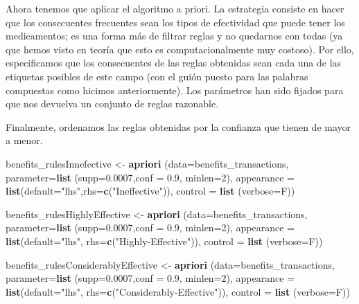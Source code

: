 \documentclass[spanish,]{article}
\newenvironment{Shaded}{\begin{snugshade}}{\end{snugshade}}
\newcommand{\KeywordTok}[1]{\textcolor[rgb]{0.13,0.29,0.53}{\textbf{#1}}}
\newcommand{\DataTypeTok}[1]{\textcolor[rgb]{0.13,0.29,0.53}{#1}}
\newcommand{\DecValTok}[1]{\textcolor[rgb]{0.00,0.00,0.81}{#1}}
\newcommand{\FloatTok}[1]{\textcolor[rgb]{0.00,0.00,0.81}{#1}}
\newcommand{\StringTok}[1]{\textcolor[rgb]{0.31,0.60,0.02}{#1}}
\newcommand{\NormalTok}[1]{#1}
\begin{document}
Ahora tenemos que aplicar el algoritmo a priori. La estrategia consiste
en hacer que los consecuentes frecuentes sean los tipos de efectividad
que puede tener los medicamentos; es una forma más de filtrar reglas y
no quedarnos con todas (ya que hemos visto en teoría que esto es
computacionalmente muy costoso). Por ello, especificamos que los
consecuentes de las reglas obtenidas sean cada una de las etiquetas
posibles de este campo (con el guión puesto para las palabras compuestas
como hicimos anteriormente). Los parámetros han sido fijados para que
nos devuelva un conjunto de reglas razonable.

Finalmente, ordenamos las reglas obtenidas por la confianza que tienen
de mayor a menor.

\begin{Shaded}
\begin{Highlighting}[]
\NormalTok{benefits_rulesInnefective <-}\StringTok{ }\KeywordTok{apriori}\NormalTok{ (}\DataTypeTok{data=}\NormalTok{benefits_transactions, }
                             \DataTypeTok{parameter=}\KeywordTok{list}\NormalTok{ (}\DataTypeTok{supp=}\FloatTok{0.0007}\NormalTok{,}\DataTypeTok{conf =} \FloatTok{0.9}\NormalTok{, }\DataTypeTok{minlen=}\DecValTok{2}\NormalTok{), }
                             \DataTypeTok{appearance =} \KeywordTok{list}\NormalTok{(}\DataTypeTok{default=}\StringTok{"lhs"}\NormalTok{,}\DataTypeTok{rhs=}\KeywordTok{c}\NormalTok{(}\StringTok{"Ineffective"}\NormalTok{)), }
                             \DataTypeTok{control =} \KeywordTok{list}\NormalTok{ (}\DataTypeTok{verbose=}\NormalTok{F))}

\NormalTok{benefits_rulesHighlyEffective <-}\StringTok{ }\KeywordTok{apriori}\NormalTok{ (}\DataTypeTok{data=}\NormalTok{benefits_transactions, }
                             \DataTypeTok{parameter=}\KeywordTok{list}\NormalTok{ (}\DataTypeTok{supp=}\FloatTok{0.0007}\NormalTok{,}\DataTypeTok{conf =} \FloatTok{0.9}\NormalTok{, }\DataTypeTok{minlen=}\DecValTok{2}\NormalTok{), }
                             \DataTypeTok{appearance =} \KeywordTok{list}\NormalTok{(}\DataTypeTok{default=}\StringTok{"lhs"}\NormalTok{,}
                                               \DataTypeTok{rhs=}\KeywordTok{c}\NormalTok{(}\StringTok{"Highly-Effective"}\NormalTok{)), }
                             \DataTypeTok{control =} \KeywordTok{list}\NormalTok{ (}\DataTypeTok{verbose=}\NormalTok{F))}

\NormalTok{benefits_rulesConsiderablyEffective <-}\StringTok{ }\KeywordTok{apriori}\NormalTok{ (}\DataTypeTok{data=}\NormalTok{benefits_transactions, }
                              \DataTypeTok{parameter=}\KeywordTok{list}\NormalTok{ (}\DataTypeTok{supp=}\FloatTok{0.0007}\NormalTok{,}\DataTypeTok{conf =} \FloatTok{0.9}\NormalTok{, }\DataTypeTok{minlen=}\DecValTok{2}\NormalTok{), }
                              \DataTypeTok{appearance =} \KeywordTok{list}\NormalTok{(}\DataTypeTok{default=}\StringTok{"lhs"}\NormalTok{,}
                                                \DataTypeTok{rhs=}\KeywordTok{c}\NormalTok{(}\StringTok{"Considerably-Effective"}\NormalTok{)), }
                              \DataTypeTok{control =} \KeywordTok{list}\NormalTok{ (}\DataTypeTok{verbose=}\NormalTok{F))}


\end{Highlighting}
\end{Shaded}
\end{document}
